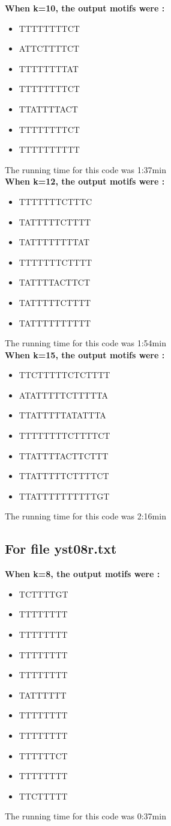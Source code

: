 \documentclass{report}
\begin{document}
\textbf{When k=10, the output motifs were : }
\begin{itemize}
    \item TTTTTTTTCT
    \item ATTCTTTTCT
    \item TTTTTTTTAT
    \item TTTTTTTTCT
    \item TTATTTTACT
    \item TTTTTTTTCT
    \item TTTTTTTTTT

\end{itemize}
The running time for this code was 1:37min\\

\textbf{When k=12, the output motifs were : }
\begin{itemize}
    \item TTTTTTTCTTTC
    \item TATTTTTCTTTT
    \item TATTTTTTTTAT
    \item TTTTTTTCTTTT
    \item TATTTTACTTCT
    \item TATTTTTCTTTT
    \item TATTTTTTTTTT
\end{itemize}
The running time for this code was 1:54min\\

\textbf{When k=15, the output motifs were : }
\begin{itemize}
    \item TTCTTTTTCTCTTTT
    \item ATATTTTTCTTTTTA
    \item TTATTTTTATATTTA
    \item TTTTTTTTCTTTTCT
    \item TTATTTTACTTCTTT
    \item TTATTTTTCTTTTCT
    \item TTATTTTTTTTTTGT

\end{itemize}
The running time for this code was 2:16min\\

\subsection{For file yst08r.txt}
\textbf{When k=8, the output motifs were : }
\begin{itemize}
    \item TCTTTTGT
    \item TTTTTTTT
    \item TTTTTTTT
    \item TTTTTTTT
    \item TTTTTTTT
    \item TATTTTTT
    \item TTTTTTTT
    \item TTTTTTTT
    \item TTTTTTCT
    \item TTTTTTTT
    \item TTCTTTTT
\end{itemize}
The running time for this code was 0:37min\\
\end{document}
